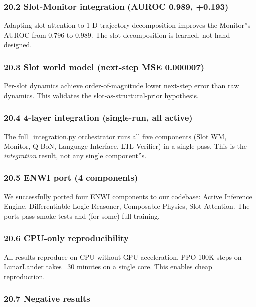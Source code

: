 \documentclass[11pt]{article}
\begin{document}
\subsubsection{20.2 Slot-Monitor integration (AUROC 0.989, +0.193)}

Adapting slot attention to 1-D trajectory decomposition improves the Monitor''s
AUROC from 0.796 to 0.989. The slot decomposition is learned, not
hand-designed.

\subsubsection{20.3 Slot world model (next-step MSE 0.000007)}

Per-slot dynamics achieve order-of-magnitude lower next-step error than raw
dynamics. This validates the slot-as-structural-prior hypothesis.

\subsubsection{20.4 4-layer integration (single-run, all active)}

The full\_integration.py orchestrator runs all five components (Slot WM, Monitor,
Q-BoN, Language Interface, LTL Verifier) in a single pass. This is the
\textit{integration} result, not any single component''s.

\subsubsection{20.5 ENWI port (4 components)}

We successfully ported four ENWI components to our codebase: Active Inference
Engine, Differentiable Logic Reasoner, Composable Physics, Slot Attention. The
ports pass smoke tests and (for some) full training.

\subsubsection{20.6 CPU-only reproducibility}

All results reproduce on CPU without GPU acceleration. PPO 100K steps on
LunarLander takes ~30 minutes on a single core. This enables cheap reproduction.

\subsubsection{20.7 Negative results}
\end{document}
